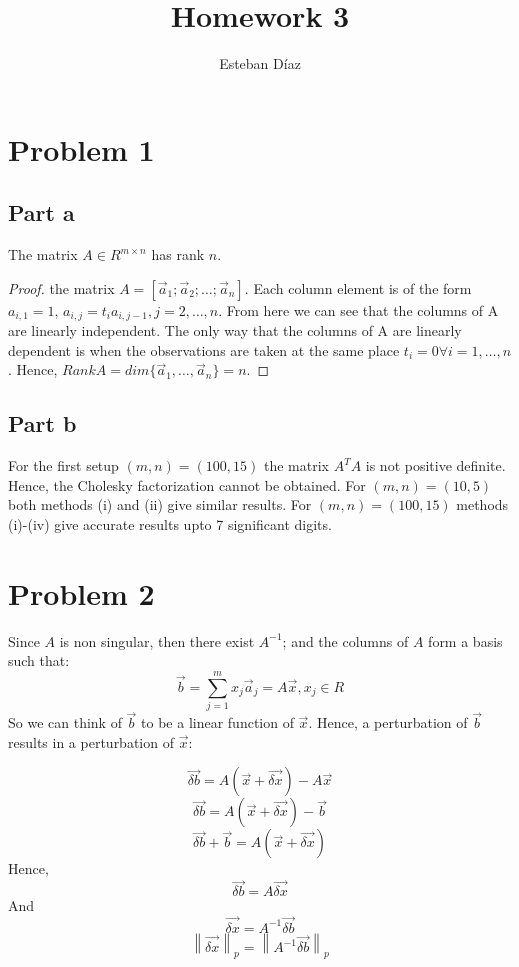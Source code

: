 \documentclass[10pt]{article}
\author{Esteban D\'{i}az}
\title{Homework 3}{}
\newcommand{\norm}[1]{\left\lVert#1\right\rVert_p}
\begin{document}
\maketitle

\section{Problem 1}
\subsection{Part a}
  The matrix $A \in R^{m\times n}$ has rank $n$.
  \begin{proof}
    the matrix $A=[\vec{a}_1;\vec{a}_2;\dots;\vec{a}_n]$. Each 
  column element is of the form $a_{i,1} = 1$, $a_{i,j} = t_ia_{i,j-1}, j=2,\dots,n$. From 
  here we can see that the columns of A are linearly independent. 
  The only way that the columns of A are linearly dependent is 
  when the observations are taken at the same place $t_i=0\forall i=1,\dots,n$.  
  Hence, $Rank A = dim\{\vec{a}_1,\dots,\vec{a}_n\} = n$.
  \end{proof}
\subsection{Part b}
    For the first setup $(m,n)=(100,15)$ the matrix $A^TA$ is 
    not positive definite. Hence, the Cholesky factorization
    cannot be obtained. For $(m,n)=(10,5)$ both methods (i) and (ii)
    give similar results. For $(m,n)=(100,15)$ methods (i)-(iv)
    give accurate results upto 7 significant digits. 


\section{Problem 2}
  Since $A$ is non singular, then there exist $A^{-1}$; and the
  columns of $A$ form a basis such that:
      \[
      \vec{b} = \sum_{j=1}^m x_j \vec{a}_j = A\vec{x}, x_j\in R 
      \]
    So we can think of $\vec{b}$ to be a linear function of $\vec{x}$.
  Hence, a perturbation of $\vec{b}$ results in a perturbation of $\vec{x}$:

   \[
    \vec{\delta b} = A(\vec{x} +\vec{\delta x})-A\vec{x}
    \] 
   \[
    \vec{\delta b} = A(\vec{x} +\vec{\delta x})-\vec{b}
   \] 
    \[
    \vec{\delta b}+\vec{b}= A(\vec{x} +\vec{\delta x})
    \]
    Hence,
    \[
    \vec{\delta b} = A\vec{\delta x}
    \]
    And 
    \[
    \vec{\delta x} = A^{-1} \vec{\delta b}
    \]
    \begin{equation}
    \norm{\vec{\delta x}} =\norm{ A^{-1} \vec{\delta b}}
    \end{equation}
\end{document}
